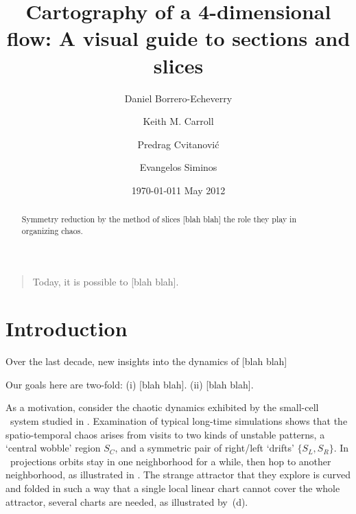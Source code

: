 \documentclass[aip,cha,
secnumarabic,
nofootinbib, tightenlines,
nobibnotes, showkeys, showpacs,
groupedaddress,
preprint,%
]{revtex4-1}
\begin{document}
\title[Low-dimensional cartography]
{Cartography of a 4-dimensional flow: A visual guide to sections and slices}

\author{Daniel Borrero-Echeverry}
\author{Keith M. Carroll}
\author{Predrag Cvitanovi\'{c}}
\author{Evangelos Siminos}
    \ifdraft
\date{\today}
    \else
\date{1 May 2012}
   \fi


    \begin{abstract}
Symmetry reduction by the method of slices [blah blah]
the role they play in organizing chaos.
    \end{abstract}

\maketitle



    \begin{quotation}
Today, it is possible to  [blah blah].
    \end{quotation}

\section{Introduction}
\label{s:intro}

Over the last decade, new insights into the dynamics of  [blah blah]

Our goals here are two-fold:
(i)  [blah blah].
(ii) [blah blah].

As a motivation, consider the chaotic dynamics exhibited by the
small-cell \KS\ system studied in . Examination of
typical long-time simulations shows that the spatio-temporal chaos arises
from visits to two kinds of unstable patterns, a `central wobble' region
$S_C$, and a symmetric pair of right/left `drifts' $\{S_L,S_R\}$. In
\statesp\ projections orbits stay in one neighborhood for a while, then
hop to another neighborhood, as illustrated in . The
strange attractor that they explore is curved and folded in such a way
that a single local linear chart cannot cover the whole attractor,
several charts are needed, as illustrated by \,(d).
\end{document}
